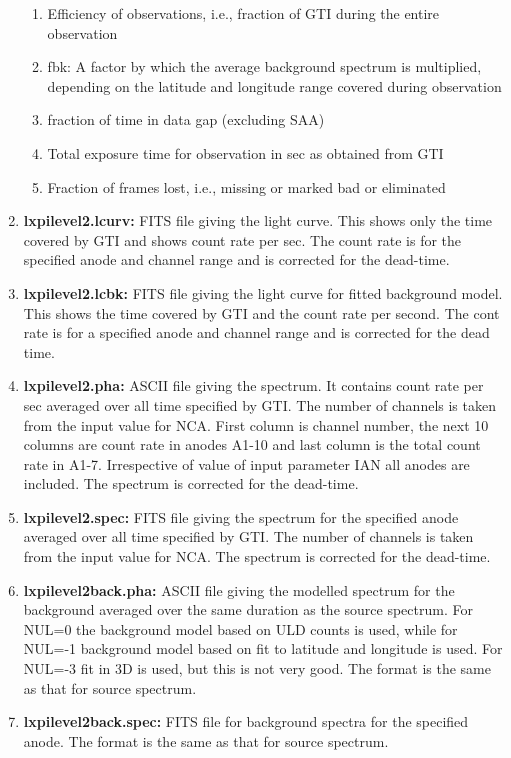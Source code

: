 \documentclass[a4paper,twoside]{report}
\numberwithin{equation}{section}
\begin{document}
\begin{enumerate}
{\begin{enumerate}
\item Efficiency of observations, i.e., fraction of GTI during the entire observation
\item fbk: A factor by which the average background spectrum is multiplied, depending on the latitude and longitude range covered during observation
\item fraction of time in data gap (excluding SAA)
\item Total exposure time for observation in sec as obtained from GTI
\item Fraction of frames lost, i.e., missing or marked bad or eliminated
\end{enumerate}
}
\item \textbf{lxpilevel2.lcurv:} FITS file giving the light curve. This shows only the time covered by GTI and shows count rate per sec. The count rate is for the specified anode and channel range and is corrected for the dead-time.
\item \textbf{lxpilevel2.lcbk:} FITS file giving the light curve for fitted background model. This shows the time covered by GTI and the count rate per second. The cont rate is for a specified anode and channel range and is corrected for the dead time. 
\item \textbf{lxpilevel2.pha:} ASCII file giving the spectrum. It contains count rate per sec averaged over all time specified by GTI. The number of channels is taken from the input value for NCA. First column is channel number, the next 10 columns are count rate in anodes A1-10 and last column is the total count rate in A1-7. Irrespective of value of input parameter IAN all anodes are included. The spectrum is corrected for the dead-time.
\item \textbf{lxpilevel2.spec:} FITS file giving the spectrum for the specified anode averaged over all time specified by GTI.  The number of channels is taken from the input value for NCA. The spectrum is corrected for the dead-time.
\item \textbf{lxpilevel2back.pha:} ASCII file giving the modelled spectrum for the background averaged over the same duration as the source spectrum. For NUL=0 the background model based on ULD counts is used, while for NUL=-1 background model based on fit to latitude and longitude is used.  For NUL=-3 fit in 3D is used, but this is not very good. The format is the same as that for source spectrum.
\item \textbf{lxpilevel2back.spec:} FITS file for background spectra for the specified anode. The format is the same as that for source spectrum.

\end{enumerate}
\end{document}
